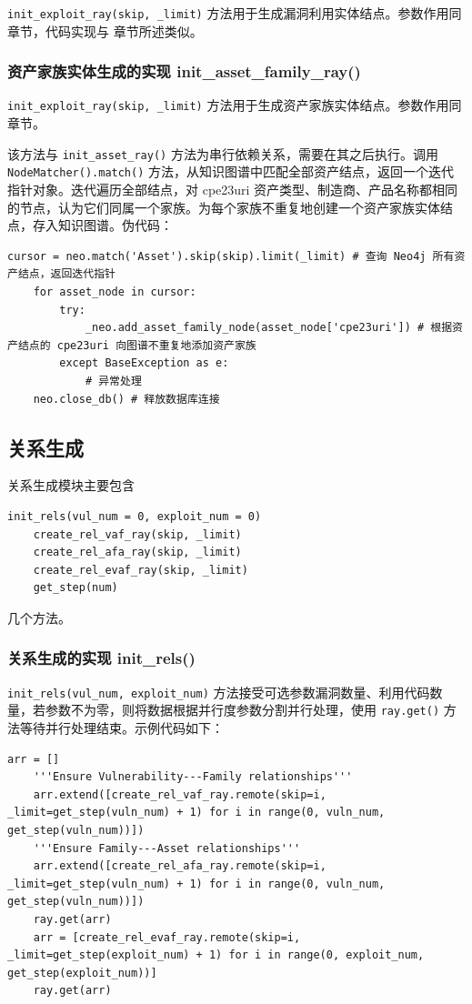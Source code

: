 \documentclass[a4paper,AutoFakeBold,oneside,12pt]{book}
\begin{document}
\lstinline|init_exploit_ray(skip, _limit)| 方法用于生成漏洞利用实体结点。参数作用同  章节，代码实现与  章节所述类似。

\subsubsection{资产家族实体生成的实现 init{\_}asset{\_}family{\_}ray()}

\lstinline|init_exploit_ray(skip, _limit)| 方法用于生成资产家族实体结点。参数作用同  章节。

该方法与 \lstinline|init_asset_ray()| 方法为串行依赖关系，需要在其之后执行。调用 \lstinline|NodeMatcher().match()| 方法，从知识图谱中匹配全部资产结点，返回一个迭代指针对象。迭代遍历全部结点，对 cpe23uri 资产类型、制造商、产品名称都相同的节点，认为它们同属一个家族。为每个家族不重复地创建一个资产家族实体结点，存入知识图谱。伪代码：
\begin{lstlisting}[style=lgeneral]
	cursor = neo.match('Asset').skip(skip).limit(_limit) # 查询 Neo4j 所有资产结点，返回迭代指针
	for asset_node in cursor:
		try:
			_neo.add_asset_family_node(asset_node['cpe23uri']) # 根据资产结点的 cpe23uri 向图谱不重复地添加资产家族
		except BaseException as e:
			# 异常处理
	neo.close_db() # 释放数据库连接
\end{lstlisting}

\subsection{关系生成}

关系生成模块主要包含
\begin{lstlisting}[style=lgeneral]
	init_rels(vul_num = 0, exploit_num = 0)
	create_rel_vaf_ray(skip, _limit)
	create_rel_afa_ray(skip, _limit)
	create_rel_evaf_ray(skip, _limit)
	get_step(num)
\end{lstlisting}
几个方法。

\subsubsection{关系生成的实现 init{\_}rels()}

\lstinline|init_rels(vul_num, exploit_num)| 方法接受可选参数漏洞数量、利用代码数量，若参数不为零，则将数据根据并行度参数分割并行处理，使用 \lstinline|ray.get()| 方法等待并行处理结束。示例代码如下：
\begin{lstlisting}[style=lgeneral]
	arr = []
	'''Ensure Vulnerability---Family relationships'''
	arr.extend([create_rel_vaf_ray.remote(skip=i, _limit=get_step(vuln_num) + 1) for i in range(0, vuln_num, get_step(vuln_num))])
	'''Ensure Family---Asset relationships'''
	arr.extend([create_rel_afa_ray.remote(skip=i, _limit=get_step(vuln_num) + 1) for i in range(0, vuln_num, get_step(vuln_num))])
	ray.get(arr)
	arr = [create_rel_evaf_ray.remote(skip=i, _limit=get_step(exploit_num) + 1) for i in range(0, exploit_num, get_step(exploit_num))]
	ray.get(arr)
\end{lstlisting}
\end{document}
